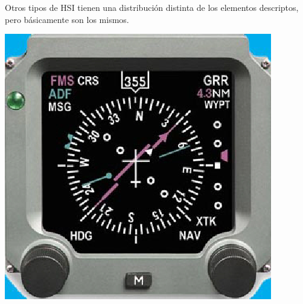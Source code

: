 Otros tipos de HSI tienen una distribución distinta de los elementos descriptos, pero básicamente son los mismos.

\begin{minipage}[c]{0.45\textwidth}
  \begin{center}
  \includegraphics[width=0.9\linewidth]{06.radionavegacion/Imagenes/06.02.vor.imagenes/hsi_ehsi-4000.eps}
  \label{fig:HSI_001}  
\end{center}
\end{minipage}\hspace{0.05\textwidth}
